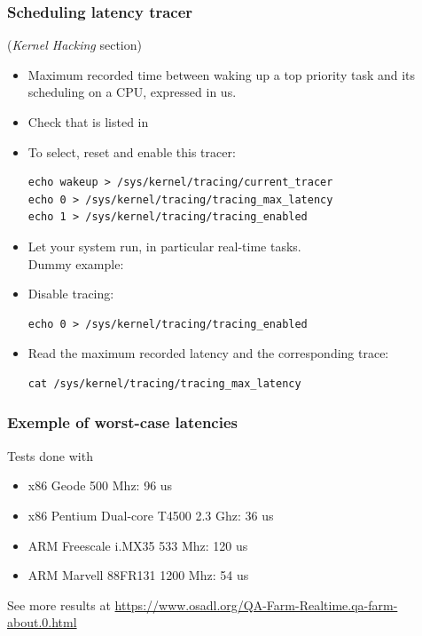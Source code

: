 \begin{frame}[fragile]
  \frametitle{Scheduling latency tracer}
  \fontsize{9}{9}\selectfont
   ({\em Kernel Hacking} section)
  \begin{itemize}
  \item Maximum recorded time between waking up a top priority task
    and its scheduling on a CPU, expressed in us.
  \item Check that  is listed in
  \item To select, reset and enable this tracer:
    \begin{block}{}
\begin{verbatim}
echo wakeup > /sys/kernel/tracing/current_tracer
echo 0 > /sys/kernel/tracing/tracing_max_latency
echo 1 > /sys/kernel/tracing/tracing_enabled
\end{verbatim}
    \end{block}
  \item Let your system run, in particular real-time tasks.\\
    Dummy example: 
  \item Disable tracing:\\
    \begin{block}{}
\begin{verbatim}
echo 0 > /sys/kernel/tracing/tracing_enabled
\end{verbatim}
    \end{block}{}
  \item Read the maximum recorded latency and the corresponding trace:\\
    \begin{block}{}
\begin{verbatim}
cat /sys/kernel/tracing/tracing_max_latency
\end{verbatim}
    \end{block}{}
  \end{itemize}
\end{frame}
\begin{frame}
  \frametitle{Exemple of worst-case latencies}
  Tests done with 
  \begin{itemize}
  \item x86 Geode 500 Mhz: 96 us
  \item x86 Pentium Dual-core T4500 2.3 Ghz: 36 us
  \item ARM Freescale i.MX35 533 Mhz: 120 us
  \item ARM Marvell 88FR131 1200 Mhz: 54 us
  \end{itemize}
  See more results at
  \url{https://www.osadl.org/QA-Farm-Realtime.qa-farm-about.0.html}
\end{frame}

